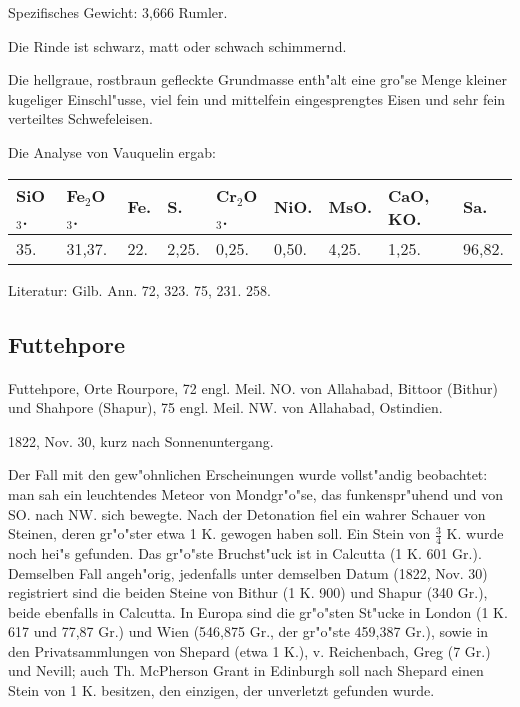 \documentclass[a4paper, 11pt, oneside]{article}
\begin{document}
Spezifisches Gewicht: 3,666 Rumler.

Die Rinde ist schwarz, matt oder schwach schimmernd.

Die hellgraue, rostbraun gefleckte Grundmasse enth"alt eine gro"se Menge kleiner kugeliger Einschl"usse, viel fein und mittelfein eingesprengtes Eisen und sehr fein verteiltes Schwefeleisen.

Die Analyse von Vauquelin ergab:
\begin{table}[!ht]
    \centering
    \footnotesize
    \begin{tabular}{l l l l l l l l l}
        SiO$_{3}$. & Fe$_{2}$O$_{3}$. & Fe. & S. & Cr$_{2}$O$_{3}$. & NiO. & MsO. & CaO, KO. & Sa. \\ \hline
        35. & 31,37. & 22. & 2,25. & 0,25. & 0,50. & 4,25. & 1,25. & 96,82. \\
    \end{tabular}
\end{table}

\footnotesize
Literatur: Gilb. Ann. 72, 323. 75, 231. 258.
\subsection{Futtehpore}
\normalsize
\paragraph{}
Futtehpore, Orte Rourpore, 72 engl. Meil. NO. von Allahabad, Bittoor (Bithur) und Shahpore (Shapur), 75 engl. Meil. NW. von Allahabad, Ostindien.

1822, Nov. 30, kurz nach Sonnenuntergang.

Der Fall mit den gew"ohnlichen Erscheinungen wurde vollst"andig beobachtet: man sah ein leuchtendes Meteor von Mondgr"o"se, das funkenspr"uhend und von SO. nach NW. sich bewegte. Nach der Detonation fiel ein wahrer Schauer von Steinen, deren gr"o"ster etwa 1 K. gewogen haben soll. Ein Stein von $\frac{3}{4}$ K. wurde noch hei"s gefunden. Das gr"o"ste Bruchst"uck ist in Calcutta (1 K. 601 Gr.). Demselben Fall angeh"orig, jedenfalls unter demselben Datum (1822, Nov. 30) registriert sind die beiden Steine von Bithur (1 K. 900) und Shapur (340 Gr.), beide ebenfalls in Calcutta. In Europa sind die gr"o"sten St"ucke in London (1 K. 617 und 77,87 Gr.) und Wien (546,875 Gr., der gr"o"ste 459,387 Gr.), sowie in den Privatsammlungen von Shepard (etwa 1 K.), v. Reichenbach, Greg (7 Gr.) und Nevill; auch Th. McPherson Grant in Edinburgh soll nach Shepard einen Stein von 1 K. besitzen, den einzigen, der unverletzt gefunden wurde.
\end{document}
